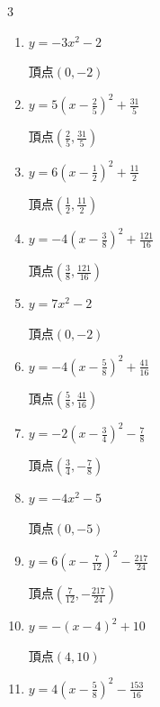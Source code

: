 \begin{multicols}{3}
\begin{enumerate}
        $\displaystyle 頂点\left( -1 , 3 \right)$

  \item $\displaystyle y=-3x^{2}-2$

        $\displaystyle 頂点\left( 0 , -2 \right)$

  \item $\displaystyle y=5\left( x-\frac{2}{5}\right)^{2}+\frac{31}{5}$

        $\displaystyle 頂点\left( \frac{2}{5} , \frac{31}{5} \right)$

  \item $\displaystyle y=6\left( x-\frac{1}{2}\right)^{2}+\frac{11}{2}$

        $\displaystyle 頂点\left( \frac{1}{2} , \frac{11}{2} \right)$

  \item $\displaystyle y=-4\left( x-\frac{3}{8}\right)^{2}+\frac{121}{16}$

        $\displaystyle 頂点\left( \frac{3}{8} , \frac{121}{16} \right)$

  \item $\displaystyle y=7x^{2}-2$

        $\displaystyle 頂点\left( 0 , -2 \right)$

  \item $\displaystyle y=-4\left( x-\frac{5}{8}\right)^{2}+\frac{41}{16}$

        $\displaystyle 頂点\left( \frac{5}{8} , \frac{41}{16} \right)$

  \item $\displaystyle y=-2\left( x-\frac{3}{4}\right)^{2}-\frac{7}{8}$

        $\displaystyle 頂点\left( \frac{3}{4} , -\frac{7}{8} \right)$

\columnbreak %

  \item $\displaystyle y=-4x^{2}-5$

        $\displaystyle 頂点\left( 0 , -5 \right)$

  \item $\displaystyle y=6\left( x-\frac{7}{12}\right)^{2}-\frac{217}{24}$

        $\displaystyle 頂点\left( \frac{7}{12} , -\frac{217}{24} \right)$

  \item $\displaystyle y=-\left( x-4\right)^{2}+10$

        $\displaystyle 頂点\left( 4 , 10 \right)$

  \item $\displaystyle y=4\left( x-\frac{5}{8}\right)^{2}-\frac{153}{16}$


\end{enumerate}
\end{multicols}
